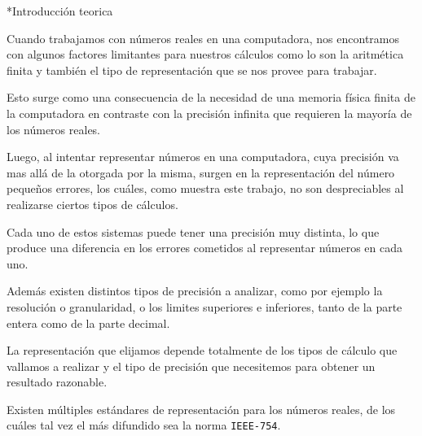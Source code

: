 \documentclass[12pt,titlepage]{article}
\newenvironment{usection}[1]{\newpage\begin{section}*{#1}	\addcontentsline{toc}{section}{#1}}{\end{section}}
\begin{document}



\begin{titlepage}
\maketitle
\end{titlepage}
\tableofcontents
\newpage

	\begin{usection}{Introducción teorica}

		Cuando trabajamos con números reales en una computadora,
		nos encontramos con algunos factores limitantes para nuestros cálculos
		como lo son la aritmética finita y
		también el tipo de representación que se nos provee para trabajar.

		Esto surge como una consecuencia de la necesidad
		de una memoria física finita de la computadora
		en contraste con la precisión infinita
		que requieren la mayoría de los números reales.

		Luego, al intentar representar números en una computadora,
		cuya precisión va mas allá de la otorgada por la misma,
		surgen en la representación del número pequeños errores,
		los cuáles, como muestra este trabajo, no son despreciables
		al realizarse ciertos tipos de cálculos.

		Cada uno de estos sistemas puede tener una precisión muy distinta,
		lo que produce una diferencia en los errores cometidos al representar
		números en cada uno.

		Además existen distintos tipos de precisión a analizar, 
		como por ejemplo la resolución o granularidad,
		o los limites superiores e inferiores,
		tanto de la parte entera como de la parte decimal.

		La representación que elijamos depende totalmente
		de los tipos de cálculo que vallamos a realizar
		y el tipo de precisión que necesitemos
		para obtener un resultado razonable.

		Existen múltiples estándares de representación para los números reales,
		de los cuáles tal vez el más difundido sea la norma \texttt{IEEE-754}.

	\end{usection}
	
\end{document}
